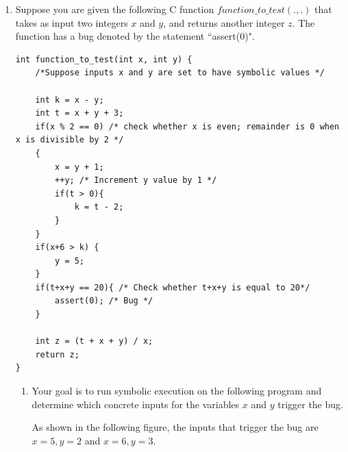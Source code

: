 \documentclass[12pt,a4paper]{article}
\begin{document}
\begin{enumerate}
\color{blue}

\color{black}

\item Suppose you are given the following C function $function\_to\_test (.,.)$ that
takes as input two integers $x$ and $y$, and returns another integer $z$. The function has a
bug denoted by the statement ``assert(0)".


\begin{lstlisting} 
int function_to_test(int x, int y) {
	/*Suppose inputs x and y are set to have symbolic values */
	
	int k = x - y;
	int t = x + y + 3;
	if(x % 2 == 0) /* check whether x is even; remainder is 0 when x is divisible by 2 */
	{
		x = y + 1;
		++y; /* Increment y value by 1 */
		if(t > 0){
			k = t - 2;
		}
	}	
	if(x+6 > k) {
		y = 5;
	}
	if(t+x+y == 20){ /* Check whether t+x+y is equal to 20*/
		assert(0); /* Bug */
	}
	
	int z = (t + x + y) / x; 
	return z;
}
\end{lstlisting}

\begin{enumerate}
\item Your goal is to run symbolic execution on the following program and determine which concrete inputs for the variables $x$ and $y$ trigger the bug.

\color{blue}

As shown in the following figure, the inputs that trigger the bug are $x=5, y = 2$ and $x = 6, y = 3$.


\end{enumerate}
\end{enumerate}
\end{document}
